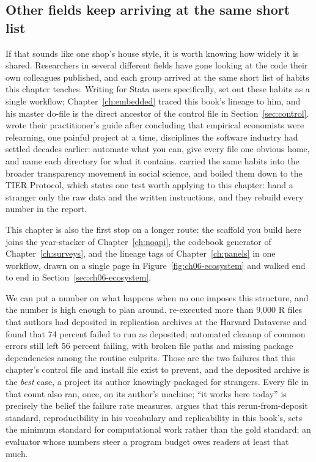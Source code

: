 \subsection{Other fields keep arriving at the same short list}\label{sec:ch02-evidence}
If that sounds like one shop's house style, it is worth knowing how widely it is shared. Researchers in several different fields have gone looking at the code their own colleagues published, and each group arrived at the same short list of habits this chapter teaches. Writing for Stata users specifically, \textcite{long2009workflow} set out these habits as a single workflow; Chapter~\ref{ch:embedded} traced this book's lineage to him, and his master do-file is the direct ancestor of the control file in Section~\ref{sec:control}. \textcite{gentzkow2014code} wrote their practitioner's guide after concluding that empirical economists were relearning, one painful project at a time, disciplines the software industry had settled decades earlier: automate what you can, give every file one obvious home, and name each directory for what it contains. \textcite{christensen2019transparent} carried the same habits into the broader transparency movement in social science, and \textcite{ball2012tier} boiled them down to the TIER Protocol, which states one test worth applying to this chapter: hand a stranger only the raw data and the written instructions, and they rebuild every number in the report.

This chapter is also the first stop on a longer route: the scaffold you build here joins the year-stacker of Chapter~\ref{ch:noapi}, the codebook generator of Chapter~\ref{ch:surveys}, and the lineage tags of Chapter~\ref{ch:panels} in one workflow, drawn on a single page in Figure~\ref{fig:ch06-ecosystem} and walked end to end in Section~\ref{sec:ch06-ecosystem}.

We can put a number on what happens when no one imposes this structure, and the number is high enough to plan around. \textcite{trisovic2022code} re-executed more than 9{,}000 R files that authors had deposited in replication archives at the Harvard Dataverse and found that 74 percent failed to run as deposited; automated cleanup of common errors still left 56 percent failing, with broken file paths and missing package dependencies among the routine culprits. Those are the two failures that this chapter's control file and install file exist to prevent, and the deposited archive is the \emph{best} case, a project its author knowingly packaged for strangers. Every file in that count also ran, once, on its author's machine; \enquote{it works here today} is precisely the belief the failure rate measures. \textcite{peng2011reproducible} argues that this rerun-from-deposit standard, reproducibility in his vocabulary and replicability in this book's, sets the minimum standard for computational work rather than the gold standard; an evaluator whose numbers steer a program budget owes readers at least that much.

